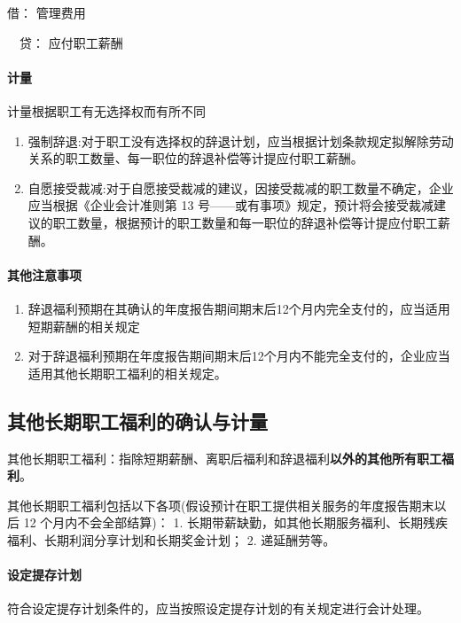 \documentclass[UTF8,12pt]{ctexart}
\newenvironment{Dr}{\noindent 借：}{\par}
\newenvironment{Cr}{\noindent \ \ 贷：}{\par}
\numberwithin{equation}{section} %
\numberwithin{figure}{section}
\numberwithin{table}{section}
\begin{document}
	\begin{Dr}
		管理费用
	\end{Dr}
	\begin{Cr}
		应付职工薪酬
	\end{Cr}
	
	\paragraph{计量}
	计量根据职工有无选择权而有所不同
	\begin{enumerate}
		\item 强制辞退:对于职工没有选择权的辞退计划，应当根据计划条款规定拟解除劳动关系的职工数量、每一职位的辞退补偿等计提应付职工薪酬。
		
		\item 自愿接受裁减:对于自愿接受裁减的建议，因接受裁减的职工数量不确定，企业应当根据《企业会计准则第 13 号——或有事项》规定，预计将会接受裁减建议的职工数量，根据预计的职工数量和每一职位的辞退补偿等计提应付职工薪酬。
	\end{enumerate}

	\paragraph{其他注意事项}
	\begin{enumerate}
		\item 辞退福利预期在其确认的年度报告期间期末后12个月内完全支付的，应当适用短期薪酬的相关规定
		
		\item 对于辞退福利预期在年度报告期间期末后12个月内不能完全支付的，企业应当适用其他长期职工福利的相关规定。
	\end{enumerate}


	\subsection{其他长期职工福利的确认与计量}
	其他长期职工福利：指除短期薪酬、离职后福利和辞退福利\textbf{以外的其他所有职工福利}。
	
	其他长期职工福利包括以下各项(假设预计在职工提供相关服务的年度报告期末以后 12 个月内不会全部结算)：
	1.	长期带薪缺勤，如其他长期服务福利、长期残疾福利、长期利润分享计划和长期奖金计划；
	2.	递延酬劳等。
	
	\paragraph{设定提存计划}
	符合设定提存计划条件的，应当按照设定提存计划的有关规定进行会计处理。
	
\end{document}
